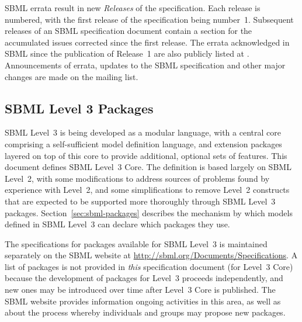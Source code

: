 SBML errata result in new \emph{Releases} of the specification.
Each release is numbered, with the first release of the
specification being number~1.  Subsequent releases of an SBML
specification document contain a section for the accumulated
issues corrected since the first release.  The errata acknowledged
in SBML \thisLV since the publication of Release~1 are also
publicly listed at
.
Announcements of errata, updates to the SBML specification and
other major changes are made on the
 mailing
list.


\subsection{SBML Level 3 Packages}
\label{sec:packages}

SBML Level~3 is being developed as a modular language, with a
central core comprising a self-sufficient model definition
language, and extension packages layered on top of this core to
provide additional, optional sets of features.  This document
defines SBML Level~3 Core.  The definition is based largely on
SBML Level~2, with some modifications to address sources of
problems found by experience with Level~2, and some
simplifications to remove Level~2 constructs that are expected to
be supported more thoroughly through SBML Level~3 packages.
Section~\ref{sec:sbml-packages} describes the mechanism by which
models defined in SBML Level~3 can declare which packages they
use.  

The specifications for packages available for SBML Level~3 is
maintained separately on the SBML website at
\url{http://sbml.org/Documents/Specifications}.  A list of
packages is not provided in \emph{this} specification document
(\ie for Level~3 Core) because the development of packages for
Level~3 proceeds independently, and new ones may be introduced
over time after Level~3 Core is published.  The SBML website
provides information ongoing activities in this area, as well as
about the process whereby individuals and groups may propose new
packages.


